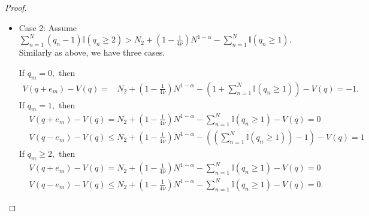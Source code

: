 \documentclass[11pt,oneside,letter]{article}
\begin{document}
\begin{proof}
\begin{itemize}
Therefore, at least one server is idle, and the incoming job is routed to a server $m$ with $q_m=0$. Under JFSQ, we have
\begin{align}
\triangledown V(q)\leq& -\sum_{n=1}^{N} \mu_n\mathbb{I}(q_n\geq 2) \nonumber\\
\leq& -\epsilon \sum_{n=1}^{N} \mathbb{I}(q_n\geq 2) \nonumber\\
\leq& -\frac{\epsilon}{b-1}\sum_{n=1}^{N} (q_n-1)\mathbb{I}(q_n\geq 2) \nonumber\\
\leq& - \frac{\epsilon c_0 }{(b-1)} N^{1-\alpha}  \nonumber %
\end{align}
where the first inequality holds according to the definition of Lyapunov drift by plugging in the cases of $q_m=0$, $q_m=1$ and $q_m\geq 2$ above; the second inequality holds by the assumption $\mu_1 \geq \cdots \geq \mu_{N} \geq \epsilon;$ the third inequality holds by the assumption of finite buffer size $b-1;$ the last inequality holds $V(q) = \sum_{n=1}^{N} (q_n-1)\mathbb{I}(q_n\geq 2) \geq c_0 {N^{1-\alpha}}.$ 

\item Case 2:  Assume $\sum_{n=1}^{N} (q_n-1)\mathbb{I}(q_n\geq 2) > N_2 + (1-\frac{1}{4\nu})N^{1-\alpha} - \sum_{n=1}^{N} \mathbb{I}(q_n\geq 1).$ Similarly as above, we have three cases. 

If $q_m = 0,$ then 
\begin{align*}
V(q+e_m) -V(q) = &N_2 + (1-\frac{1}{4\nu})N^{1-\alpha}  - \left(1+\sum_{n=1}^{N} \mathbb{I}(q_n\geq 1)\right)-V(q)=-1.
\end{align*} 
If $q_m = 1,$ then 
\begin{align*}
&V(q+e_m)-V(q) = N_2 + (1-\frac{1}{4\nu})N^{1-\alpha} -\sum_{n=1}^{ N} \mathbb{I}(q_n\geq 1)-V(q)=0\\
&V(q-e_m) -V(q)\leq N_2 + (1-\frac{1}{4\nu})N^{1-\alpha}  - \left(\left(\sum_{n=1}^{N} \mathbb{I}(q_n\geq 1)\right)-1\right)-V(q)=1
\end{align*} 
If $q_m \geq 2,$ then 
\begin{align*}
&V(q+e_m)-V(q)  = N_2 + (1-\frac{1}{4\nu})N^{1-\alpha}  - \sum_{n=1}^{N} \mathbb{I}(q_n\geq 1)-V(q)=0\\
&V(q-e_m) -V(q)\leq N_2 + (1-\frac{1}{4\nu})N^{1-\alpha} - \sum_{n=1}^{N} \mathbb{I}(q_n\geq 1)-V(q)=0.
\end{align*} 


\end{itemize}
\end{proof}
\end{document}
